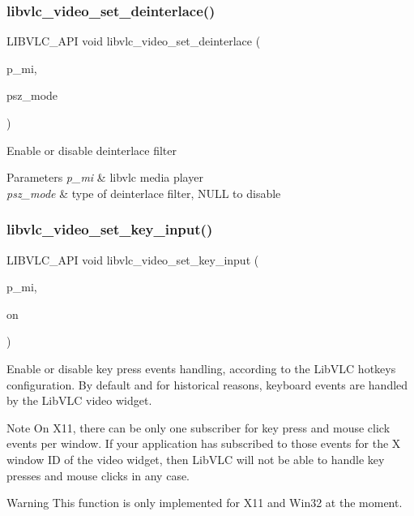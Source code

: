 \subsubsection{\texorpdfstring{libvlc\+\_\+video\+\_\+set\+\_\+deinterlace()}{libvlc\_video\_set\_deinterlace()}}
{\footnotesize\ttfamily L\+I\+B\+V\+L\+C\+\_\+\+A\+PI void libvlc\+\_\+video\+\_\+set\+\_\+deinterlace (\begin{DoxyParamCaption}\item[{libvlc\+\_\+media\+\_\+player\+\_\+t $\ast$}]{p\+\_\+mi,  }\item[{const char $\ast$}]{psz\+\_\+mode }\end{DoxyParamCaption})}

Enable or disable deinterlace filter


\begin{DoxyParams}{Parameters}
{\em p\+\_\+mi} & libvlc media player \\
\hline
{\em psz\+\_\+mode} & type of deinterlace filter, N\+U\+LL to disable \\
\hline
\end{DoxyParams}
\mbox{\label{group__libvlc__video_ga8636dead7f51bd9fb7f82c17f3e46236}} 
\subsubsection{\texorpdfstring{libvlc\+\_\+video\+\_\+set\+\_\+key\+\_\+input()}{libvlc\_video\_set\_key\_input()}}
{\footnotesize\ttfamily L\+I\+B\+V\+L\+C\+\_\+\+A\+PI void libvlc\+\_\+video\+\_\+set\+\_\+key\+\_\+input (\begin{DoxyParamCaption}\item[{libvlc\+\_\+media\+\_\+player\+\_\+t $\ast$}]{p\+\_\+mi,  }\item[{unsigned}]{on }\end{DoxyParamCaption})}

Enable or disable key press events handling, according to the Lib\+V\+LC hotkeys configuration. By default and for historical reasons, keyboard events are handled by the Lib\+V\+LC video widget.

\begin{DoxyNote}{Note}
On X11, there can be only one subscriber for key press and mouse click events per window. If your application has subscribed to those events for the X window ID of the video widget, then Lib\+V\+LC will not be able to handle key presses and mouse clicks in any case.
\end{DoxyNote}
\begin{DoxyWarning}{Warning}
This function is only implemented for X11 and Win32 at the moment.
\end{DoxyWarning}


